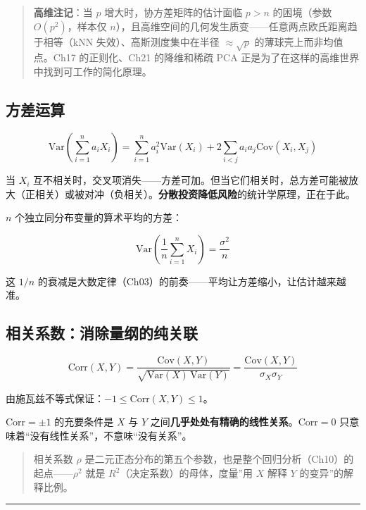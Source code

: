 \documentclass[
]{book}
\begin{document}
\begin{quote}
\textbf{高维注记}：当 \(p\) 增大时，协方差矩阵的估计面临 \(p > n\) 的困境（参数 \(O(p^2)\)，样本仅 \(n\)），且高维空间的几何发生质变------任意两点欧氏距离趋于相等（kNN 失效）、高斯测度集中在半径 \(\approx \sqrt{p}\) 的薄球壳上而非均值点。Ch17 的正则化、Ch21 的降维和稀疏 PCA 正是为了在这样的高维世界中找到可工作的简化原理。
\end{quote}

\subsection{方差运算}\label{ux65b9ux5deeux8fd0ux7b97}

\[\text{Var}\left(\sum_{i=1}^n a_i X_i\right) = \sum_{i=1}^n a_i^2 \text{Var}(X_i) + 2\sum_{i<j} a_i a_j \text{Cov}(X_i, X_j)\]

当 \(X_i\) 互不相关时，交叉项消失------方差可加。但当它们相关时，总方差可能被放大（正相关）或被对冲（负相关）。\textbf{分散投资降低风险}的统计学原理，正在于此。

\(n\) 个独立同分布变量的算术平均的方差：

\[\text{Var}\left(\frac{1}{n}\sum_{i=1}^n X_i\right) = \frac{\sigma^2}{n}\]

这 \(1/n\) 的衰减是大数定律（Ch03）的前奏------平均让方差缩小，让估计越来越准。

\subsection{相关系数：消除量纲的纯关联}\label{ux76f8ux5173ux7cfbux6570ux6d88ux9664ux91cfux7eb2ux7684ux7eafux5173ux8054}

\[\text{Corr}(X,Y) = \frac{\text{Cov}(X,Y)}{\sqrt{\text{Var}(X)\,\text{Var}(Y)}} = \frac{\text{Cov}(X,Y)}{\sigma_X \sigma_Y}\]

由施瓦兹不等式保证：\(-1 \leq \text{Corr}(X,Y) \leq 1\)。

\(\text{Corr} = \pm 1\) 的充要条件是 \(X\) 与 \(Y\) 之间\textbf{几乎处处有精确的线性关系}。\(\text{Corr} = 0\) 只意味着``没有线性关系''，不意味``没有关系''。

\begin{quote}
相关系数 \(\rho\) 是二元正态分布的第五个参数，也是整个回归分析（Ch10）的起点------\(\rho^2\) 就是 \(R^2\)（决定系数）的母体，度量''用 \(X\) 解释 \(Y\) 的变异''的解释比例。
\end{quote}

\begin{center}\rule{0.5\linewidth}{0.5pt}\end{center}
\end{document}
